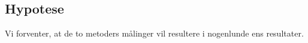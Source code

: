 \subsection*{Hypotese}
Vi forventer, at de to metoders målinger vil resultere i nogenlunde ens resultater.